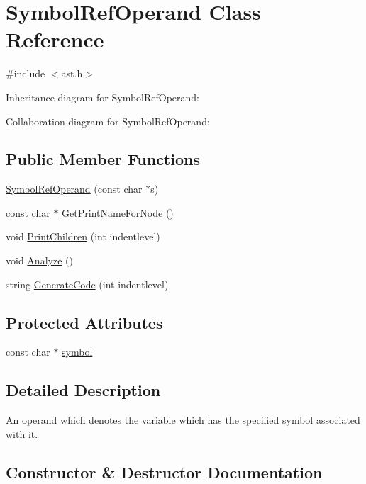 \hypertarget{class_symbol_ref_operand}{}\section{Symbol\+Ref\+Operand Class Reference}
\label{class_symbol_ref_operand}


{\ttfamily \#include $<$ast.\+h$>$}



Inheritance diagram for Symbol\+Ref\+Operand\+:


Collaboration diagram for Symbol\+Ref\+Operand\+:
\subsection*{Public Member Functions}
\begin{DoxyCompactItemize}
\item 
\hyperlink{class_symbol_ref_operand_a0c928789d6c5abc49a57eeb030c9fa7a}{Symbol\+Ref\+Operand} (const char $\ast$s)
\item 
const char $\ast$ \hyperlink{class_symbol_ref_operand_adb5689dfd85cd5da59ad1228f221a875}{Get\+Print\+Name\+For\+Node} ()
\item 
void \hyperlink{class_symbol_ref_operand_a788a41e0bcf7a1047bb7884e0c8ac857}{Print\+Children} (int indentlevel)
\item 
void \hyperlink{class_symbol_ref_operand_a41ac48ee73184e0fe254ea735c7ea471}{Analyze} ()
\item 
string \hyperlink{class_symbol_ref_operand_afdbed4a7baf9ede2a08687fc8a5704d9}{Generate\+Code} (int indentlevel)
\end{DoxyCompactItemize}
\subsection*{Protected Attributes}
\begin{DoxyCompactItemize}
\item 
const char $\ast$ \hyperlink{class_symbol_ref_operand_a3bd54497892f2bd316927b2931447826}{symbol}
\end{DoxyCompactItemize}


\subsection{Detailed Description}
An operand which denotes the variable which has the specified symbol associated with it. 

\subsection{Constructor \& Destructor Documentation}
\mbox{\label{class_symbol_ref_operand_a0c928789d6c5abc49a57eeb030c9fa7a}} 
